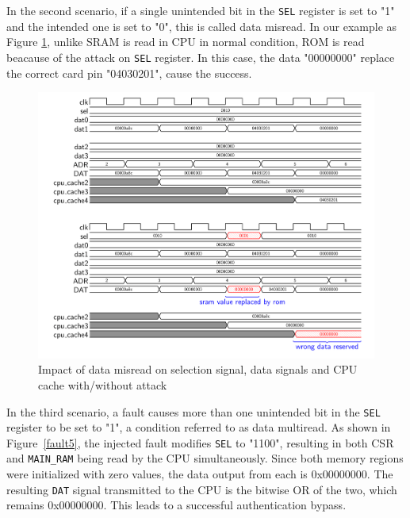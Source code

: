 In the second scenario, if a single unintended bit in the \texttt{SEL} register is set to "1" and the intended one is set to "0", this is called data misread. In our example as Figure \ref{fault4}, unlike SRAM is read in CPU in normal condition, ROM is read beacause of the attack on \texttt{SEL} register. In this case, the data "00000000" replace the correct card pin "04030201", cause the success.

\begin{figure}[t!]
  \centering
  \includegraphics[width=\linewidth]{Chapitre4/figures/fault4.png}
  \caption{Impact of data misread on selection signal, data signals and CPU cache with/without attack}
  \label{fault4}
\end{figure}

In the third scenario, a fault causes more than one unintended bit in the \texttt{SEL} register to be set to "1", a condition referred to as data multiread. As shown in Figure~\ref{fault5}, the injected fault modifies \texttt{SEL} to "1100", resulting in both CSR and \texttt{MAIN\_RAM} being read by the CPU simultaneously. Since both memory regions were initialized with zero values, the data output from each is 0x00000000. The resulting \texttt{DAT} signal transmitted to the CPU is the bitwise OR of the two, which remains 0x00000000. This leads to a successful authentication bypass.

